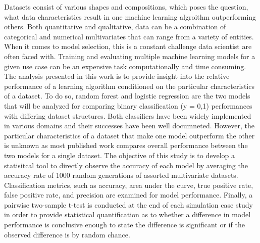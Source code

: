 \documentclass{llncs}
\begin{document}
Datasets consist of various shapes and compositions, which poses the question, what data characteristics result in one machine learning algroithm outperforming others. Both quantitative and qualitative, data can be a combination of categorical and numerical multivariates that can range from a variety of entities. When it comes to model selection, this is a constant challenge data scientist are often faced with. Training and evaluating multiple machine learning models for a given use case can be an expensive task computationally and time consuming. The analysis presented in this work is to provide insight into the relative performance of a learning algorithm conditioned on the particular characteristics of a dataset. To do so, random forest and logistic regression are the two models that will be analyzed for comparing binary classification (y = {0,1}) performances with differing dataset structures. Both classifiers have been widely implemented in various domains and their successes have been well documneted. However, the particular characteristics of a dataset that make one model outperform the other is unknown as most published work compares overall performance between the two models for a single dataset. The objective of this study is to develop a statisitcal tool to directly observe the accuracy of each model by averaging the accuracy rate of 1000 random generations of assorted multivariate datasets. Classification metrics, such as accuracy, area under the curve, true positive rate, false positive rate, and precision are examined for model performance. Finally, a pairwise two-sample t-test is conducted at the end of each simulation case study in order to provide statistical quantification as to whether a difference in model performance is conclusive enough to state the difference is significant or if the observed difference is by random chance. 
\end{document}

